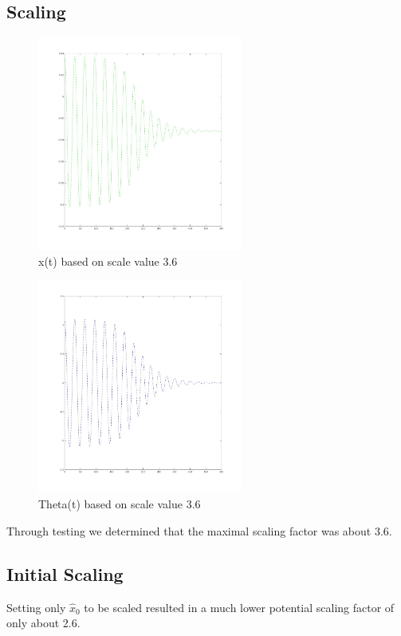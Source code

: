 \documentclass{article}
\begin{document}
\subsection{Scaling}
\begin{figure}[H]
    \centering
    \includegraphics[width=0.6\textwidth]{x_pos_segway_obs.jpg}
    \caption{x(t) based on scale value 3.6}
    \label{fig:x_segway}
\end{figure}

\begin{figure}[H]
    \centering
    \includegraphics[width=0.6\textwidth]{th_pos_segway_obs.jpg}
    \caption{Theta(t) based on scale value 3.6}
    \label{fig:th_segway}
\end{figure}
Through testing we determined that the maximal scaling factor was about 3.6.

\subsection{Initial Scaling}
Setting only $\hat{x}_0$ to be scaled resulted in a much lower potential scaling factor of only about 2.6.
\end{document}
